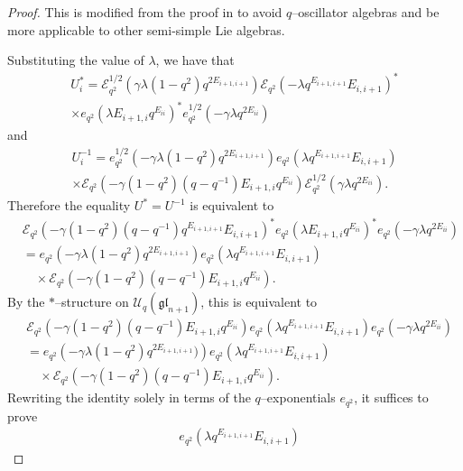 \documentclass{ximera}
\begin{document}
\begin{proof}
This is modified from the proof in \cite{GPVYZ16} to avoid $q$--oscillator algebras and be more applicable to other semi-simple Lie algebras.

Substituting the value of $\lambda$, we have that 
\begin{multline*}
U_i^*=\mathcal{E}_{q^2}^{1 / 2}\left( \gamma \lambda(1-q^2){q^{2E_{i+1,i+1}}}  \right)    \mathcal{E}_{q^2} \left(-\lambda q^{E_{i+1,i+1}}E_{i,i+1}    \right)  ^*  \\\times
e_{q^2}(\lambda E_{i+1,i} q^{E_{ii}}  ) ^*
  e_{q^2}^{1/2}\left( -\gamma \lambda q^{2E_{ii}}\right) 
\end{multline*}
and
\begin{multline*}
U_i^{-1}= e_{q^2}^{1 / 2}\left(- \gamma \lambda(1-q^2){q^{2E_{i+1,i+1}}}  \right)   {e}_{q^2}(\lambda q^{E_{i+1,i+1}}E_{i,i+1})  \\
\times\mathcal{E}_{q^2}
\left(-\gamma(1-q^2)(q-q^{-1})E_{i+1,i}q^{E_{ii}}  \right) \mathcal{E}_{q^2}^{1/2}\left( \gamma \lambda q^{2E_{ii}}\right) .
\end{multline*}
Therefore the equality $U^*=U^{-1}$ is equivalent to 
\begin{align*}
& \mathcal{E}_{q^2} \left(-\gamma(1-q^2)(q-q^{-1}) q^{E_{i+1,i+1}}E_{i,i+1}    \right)  ^*   e_{q^2}(\lambda E_{i+1,i} q^{E_{ii}}  ) ^*
e_{q^2}\left( -\gamma \lambda q^{2E_{ii}}\right)
\\ &
  =e_{q^2}\left(- \gamma \lambda(1-q^2){q^{2E_{i+1,i+1}}} \right)  {e}_{q^2}(\lambda q^{E_{i+1,i+1}}E_{i,i+1}) \\
 &\quad\times\mathcal{E}_{q^2}
\left(-\gamma(1-q^2)(q-q^{-1})E_{i+1,i}q^{E_{ii}}\right).
\end{align*}
By the $*$--structure on $\mathcal{U}_q(\mathfrak{gl}_{n+1})$, this is equivalent to 
\begin{align*}
& \mathcal{E}_{q^2} \left(-\gamma(1-q^2)(q-q^{-1}) E_{i+1,i} q^{E_{ii}}  \right)     e_{q^2}(\lambda q^{E_{i+1,i+1}}E_{i,i+1}) 
e_{q^2}\left( -\gamma \lambda q^{2E_{ii}}\right)
\\
  & = e_{q^2}\left(- \gamma \lambda(1-q^2){q^{2E_{i+1,i+1}}}) \right){e}_{q^2}(\lambda q^{E_{i+1,i+1}}E_{i,i+1}) \\&\quad\times\mathcal{E}_{q^2}
\left(-\gamma(1-q^2)(q-q^{-1})E_{i+1,i}q^{E_{ii}}\right).
\end{align*}
Rewriting the identity solely in terms of the $q$--exponentials $e_{q^2}$, it suffices to prove
\begin{align*}
&e_{q^2}(\lambda q^{E_{i+1,i+1}}E_{i,i+1}) 

\end{align*}
\end{proof}
\end{document}
